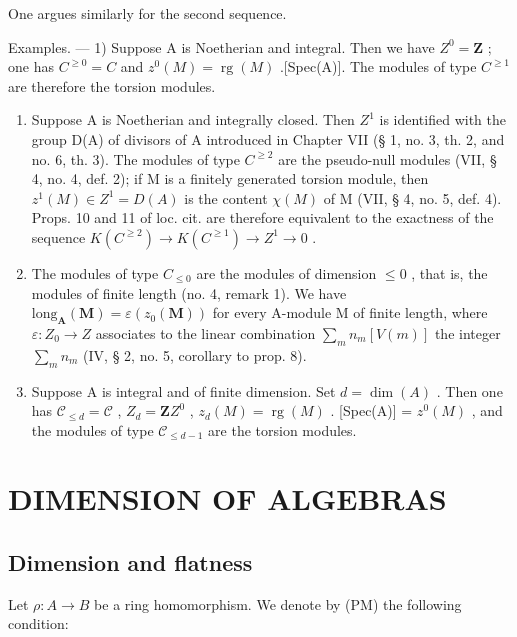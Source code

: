 One argues similarly for the second sequence.

Examples. --- 1) Suppose A is Noetherian and integral. Then we have \(Z^0 = \mathbf{Z}\){}{} ; one has \(C^{\geqslant 0} = C\) and \(z^0(M) = \operatorname{rg}(M)\) .[Spec(A)]. The modules of type \(C^{\geqslant 1}\) are therefore the torsion modules.

\begin{enumerate}
\def\labelenumi{\arabic{enumi})}
\setcounter{enumi}{1}
\item
  Suppose A is Noetherian and integrally closed. Then \(Z^1\) is identified with the group D(A) of divisors of A introduced in Chapter VII (§ 1, no. 3, th. 2, and no. 6, th. 3). The modules of type \(C^{\geqslant 2}\) are the pseudo-null modules (VII, § 4, no. 4, def. 2); if M is a finitely generated torsion module, then \(z^1(M) \in Z^1 = D(A)\) is the content \(\chi(M)\) of M (VII, § 4, no. 5, def. 4). Props. 10 and 11 of loc. cit. are therefore equivalent to the exactness of the sequence \(K(C^{\geqslant 2}) \to K(C^{\geqslant 1}) \to Z^1 \to 0\) .
\item
  The modules of type \(C_{\leqslant0}\) are the modules of dimension \(\leqslant0\) , that is, the modules of finite length (no. 4, remark 1). We have \(\text{long}_{\mathbf{A}}(\mathbf{M}) = \varepsilon(z_0(\mathbf{M}))\) for every A-module M of finite length, where \(\varepsilon: Z_0 \to Z\) associates to the linear combination \(\sum_{m} n_{m}[V(m)]\) the integer \(\sum_{m} n_{m}\) (IV, § 2, no. 5, corollary to prop. 8).
\item
  Suppose A is integral and of finite dimension. Set \(d = \dim(A)\) . Then one has \(\mathcal{C}_{\leq d} = \mathcal{C}\) , \(Z_d = \mathbf{Z}\){}{}\(Z^0\) , \(z_d(M) = \operatorname{rg}(M)\) . [Spec(A)] = \(z^0(M)\) , and the modules of type \(\mathcal{C}_{\leq d-1}\) are the torsion modules.
\end{enumerate}

\section{DIMENSION OF ALGEBRAS}

\subsection{Dimension and flatness}

Let \(\rho: A \to B\) be a ring homomorphism. We denote by (PM) the following condition:

